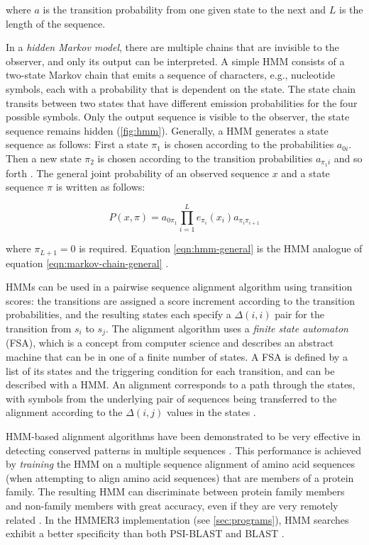 where $a$ is the transition probability from one given state to the next and $L$
is the length of the sequence.

In a \emph{hidden Markov model}, there are multiple chains that are invisible to
the observer, and only its output can be interpreted. A simple HMM consists of a
two-state Markov chain that emits a sequence of characters, e.g., nucleotide
symbols, each with a probability that is dependent on the state. The state chain
transits between two states that have different emission probabilities for the
four possible symbols. Only the output sequence is visible to the observer, the
state sequence remains hidden (\autoref{fig:hmm}).
Generally, a HMM generates a state sequence as follows: First a state $\pi_1$ is
chosen according to the probabilities $a_{0i}$. Then a new state $\pi_2$ is
chosen according to the transition probabilities $a_{\pi_{1}i}$ and so forth
\citep{durbin1998}. The general joint probability of an observed sequence $x$
and a state sequence $\pi$ is written as follows:

\begin{equation}
P(x,\pi) = a_{0\pi_1} \prod_{i=1}^L e_{\pi_i}(x_i)a_{\pi_i\pi_{i+1}}
\label{eqn:hmm-general}
\end{equation}

where $\pi_{L+1} = 0$ is required. Equation \eqref{eqn:hmm-general} is the HMM
analogue of equation \eqref{eqn:markov-chain-general} \citep{durbin1998}.



HMMs can be used in a pairwise sequence alignment algorithm using transition
scores: the transitions are assigned a score increment according to the
transition probabilities, and the resulting states each specify a $\Delta(i,i)$
pair for the transition from $s_i$ to $s_j$. The alignment algorithm uses a
\emph{finite state automaton} (FSA), which is a concept from computer science
and describes an abstract machine that can be in one of a finite number of
states. A FSA is defined by a list of its states and the triggering condition
for each transition, and can be described with a HMM. An alignment corresponds
to a path through the states, with symbols from the underlying pair of sequences
being transferred to the alignment according to the $\Delta(i,j)$ values in the
states \citep{durbin1998}. 

HMM-based alignment algorithms have been demonstrated to be very effective in
detecting conserved patterns in multiple sequences \citep{eddy1995, hughey1996}.
This performance is achieved by \emph{training} the HMM on a multiple sequence
alignment of amino acid sequences (when attempting to align amino acid
sequences) that are members of a protein family. The resulting HMM can
discriminate between protein family members and non-family members with great
accuracy, even if they are very remotely related \citep{karplus1998}. In the
HMMER3 implementation (see \autoref{sec:programs}), HMM searches exhibit a
better specificity \citep{korf2004} than both PSI-BLAST \citep{altschul1997} and
BLAST \citep{altschul1990}.
